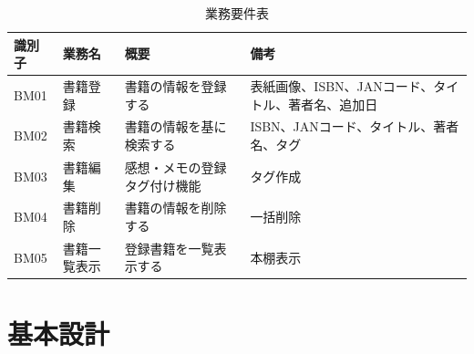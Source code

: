 \documentclass[a4paper, 11pt, titlepage]{jsarticle}
\begin{document}
\begin{table}[htbp]
  \centering
  \begin{tabular}{|l|l|>{\centering\arraybackslash}m{4cm}|>{\centering\arraybackslash}m{5cm}|}
    \hline
    \textbf{識別子} & \textbf{業務名} & \textbf{概要} & \textbf{備考} \\
    \hline\hline
    BM01 & 書籍登録 & 書籍の情報を登録する & 表紙画像、ISBN、JANコード、タイトル、著者名、追加日 \\
    \hline
    BM02 & 書籍検索 & 書籍の情報を基に検索する & ISBN、JANコード、タイトル、著者名、タグ \\
    \hline
    BM03 & 書籍編集 & 感想・メモの登録タグ付け機能 & タグ作成 \\
    \hline
    BM04 & 書籍削除 & 書籍の情報を削除する & 一括削除 \\
    \hline
    BM05 & 書籍一覧表示 & 登録書籍を一覧表示する & 本棚表示 \\
    \hline
  \end{tabular}
  \caption{業務要件表}
  \label{tab:requirements}
\end{table}

\section{基本設計}
\end{document}
